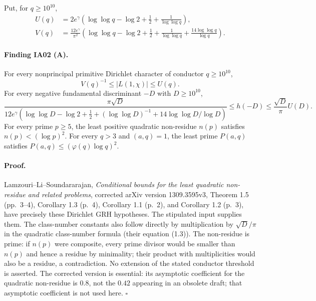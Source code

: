 \documentclass[11pt,a4paper]{article}
\theoremstyle{definition}
\begin{document}
Put, for $q\geq 10^{10}$,
\begin{align*}
 U(q)&=2e^\gamma\left(\log\log q-\log2+\frac12+
              \frac1{\log\log q}\right),\\
 V(q)&=\frac{12e^\gamma}{\pi^2}
 \left(\log\log q-\log2+\frac12+
              \frac1{\log\log q}+\frac{14\log\log q}{\log q}\right).
\end{align*}

\paragraph{Finding IA02 (A).}
For every nonprincipal primitive Dirichlet character of conductor
$q\geq10^{10}$,
\[
             V(q)^{-1}\leq |L(1,\chi)|\leq U(q).
\]
For every negative fundamental discriminant $-D$ with $D\geq10^{10}$,
\[
 \frac{\pi\sqrt D}{12e^\gamma
 (\log\log D-\log2+\frac12+(\log\log D)^{-1}
                     +14\log\log D/\log D)}
 \leq h(-D)\leq\frac{\sqrt D}{\pi}U(D).
\]
For every prime $p\geq5$, the least positive quadratic non-residue
$n(p)$ satisfies $n(p)<(\log p)^2$.  For every $q>3$ and
$(a,q)=1$, the least prime $P(a,q)$ satisfies
$P(a,q)\leq(\varphi(q)\log q)^2$.

\paragraph{Proof.}
Lamzouri--Li--Soundararajan, \emph{Conditional bounds for the least
quadratic non-residue and related problems}, corrected arXiv version
1309.3595v3, Theorem 1.5 (pp.~3--4), Corollary 1.3 (p.~4),
Corollary 1.1 (p.~2), and Corollary 1.2 (p.~3), have precisely these
Dirichlet GRH hypotheses.  The stipulated input supplies them.
The class-number constants also follow directly by multiplication by
$\sqrt D/\pi$ in the quadratic class-number formula (their equation
(1.3)).  The non-residue is prime: if $n(p)$ were composite, every
prime divisor would be smaller than $n(p)$ and hence a residue by
minimality; their product with multiplicities would also be a residue,
a contradiction.  No extension of the stated conductor threshold
is asserted.  The corrected version is essential: its asymptotic
coefficient for the quadratic non-residue is $0.8$, not the $0.42$
appearing in an obsolete draft; that asymptotic coefficient is not used
here. \hfill$\square$
\end{document}
